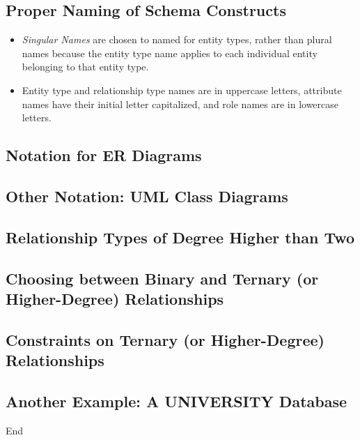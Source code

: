\documentclass[10pt]{article}
\begin{document}
\subsection{Proper Naming of Schema Constructs}
\begin{itemize}
	\item \textit{Singular Names} are chosen to named for entity types, rather than plural names because the entity type name applies to each individual entity belonging to that entity type.
	\item Entity type and relationship type names are in uppercase letters, attribute names have their initial letter capitalized, and role names are in lowercase letters. 
\end{itemize}

\subsection{Notation for ER Diagrams}
\bigbreak

\subsection{Other Notation: UML Class Diagrams}

\subsection{Relationship Types of Degree Higher than Two}
\bigbreak

\subsection{Choosing between Binary and Ternary (or Higher-Degree) Relationships}
\bigbreak

\subsection{Constraints on Ternary (or Higher-Degree) Relationships}
\bigbreak

\subsection{Another Example: A UNIVERSITY Database}
\bigbreak

\begin{center}
	End
\end{center}
\pagebreak
\end{document}
